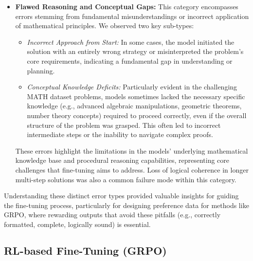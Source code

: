\documentclass[11pt]{article}
\begin{document}
\begin{itemize}
    \item \textbf{Flawed Reasoning and Conceptual Gaps:} This category encompasses errors stemming from fundamental misunderstandings or incorrect application of mathematical principles. We observed two key sub-types:
        \begin{itemize}
            \item \textit{Incorrect Approach from Start:} In some cases, the model initiated the solution with an entirely wrong strategy or misinterpreted the problem's core requirements, indicating a fundamental gap in understanding or planning.
            \item \textit{Conceptual Knowledge Deficits:} Particularly evident in the challenging MATH dataset problems, models sometimes lacked the necessary specific knowledge (e.g., advanced algebraic manipulations, geometric theorems, number theory concepts) required to proceed correctly, even if the overall structure of the problem was grasped. This often led to incorrect intermediate steps or the inability to navigate complex proofs.
        \end{itemize}
    These errors highlight the limitations in the models' underlying mathematical knowledge base and procedural reasoning capabilities, representing core challenges that fine-tuning aims to address. Loss of logical coherence in longer multi-step solutions was also a common failure mode within this category.


\end{itemize}
Understanding these distinct error types provided valuable insights for guiding the fine-tuning process, particularly for designing preference data for methods like GRPO, where rewarding outputs that avoid these pitfalls (e.g., correctly formatted, complete, logically sound) is essential.

\subsection{RL-based Fine-Tuning (GRPO)}
\end{document}

